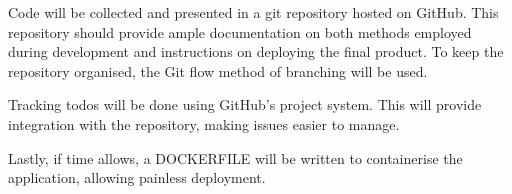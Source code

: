 Code will be collected and presented in a git repository hosted on GitHub.
This repository should provide ample documentation on both methods employed during development and instructions on deploying the final product.
To keep the repository organised, the Git flow method of branching will be used.

Tracking todos will be done using GitHub’s project system.
This will provide integration with the repository, making issues easier to manage.

Lastly, if time allows, a DOCKERFILE will be written to containerise the application, allowing painless deployment.
